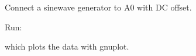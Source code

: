 

Connect a sinewave generator to A0 with DC offset.

Run\+: 
\begin{DoxyCode}{0}
\end{DoxyCode}


which plots the data with gnuplot.

 